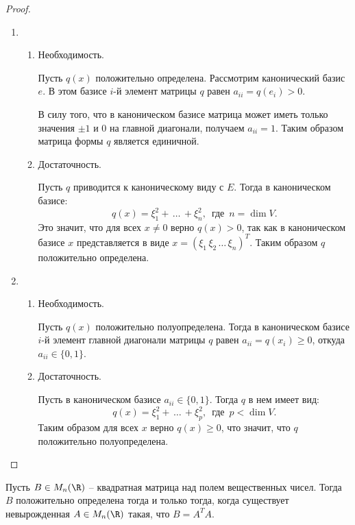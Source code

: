 \begin{proof}~
    \begin{enumerate}
        \item \begin{enumerate}
            \item Необходимость. 
            
            Пусть $q(x)$ положительно определена. Рассмотрим канонический базис $e$.
            В этом базисе $i$-й элемент матрицы $q$ равен $a_{ii} = q(e_i) > 0$. 
            
            В силу того, что в каноническом 
            базисе матрица может иметь только значения $\pm 1$ и $0$ на главной диагонали, получаем $a_{ii} = 1$.
            Таким образом матрица формы $q$ является единичной.
            \item Достаточность. 
            
            Пусть $q$ приводится к каноническому виду с $E$. Тогда в каноническом базисе: 
            $$q(x) = \xi_1^2 + \, \dots \,+ \xi_n^2, \, \text{ где } \, n = \dim V.$$ 
            Это значит, что для всех $x \neq 0$ верно $q(x) > 0$, так как в каноническом базисе 
            $x$ представляется в виде $x = (\xi_1 \, \xi_2 \, \dots \, \xi_n)^T$. Таким образом 
            $q$ положительно определена.
        \end{enumerate} 

        \item \begin{enumerate}
            \item Необходимость.
            
            Пусть $q(x)$ положительно полуопределена. Тогда в каноническом базисе $i$-й элемент 
            главной диагонали матрицы $q$ равен $a_{ii} = q(x_i) \geq 0$, 
            откуда $a_{ii} \in \{0, 1\}$.

            \item Достаточность.
            
            Пусть в каноническом базисе $a_{ii} \in \{ 0, 1\}$. Тогда $q$ в нем имеет вид:
            $$q(x) = \xi_1^2 + \, \dots \,+ \xi_p^2, \, \text{ где } \, p < \dim V.$$
            Таким образом для всех $x$ верно $q(x) \geq 0$, что значит, что $q$ положительно
            полуопределена.
        \end{enumerate}
    \end{enumerate}
\end{proof}

\begin{lemma}
    \label{pr10.3}
    Пусть $B \in M_n(\R)$ -- квадратная матрица над полем вещественных чисел. Тогда $B$ положительно 
    определена тогда и только тогда, когда существует невырожденная $A \in M_n(\R)$ такая, что 
    $B = A^T A$.
\end{lemma}

